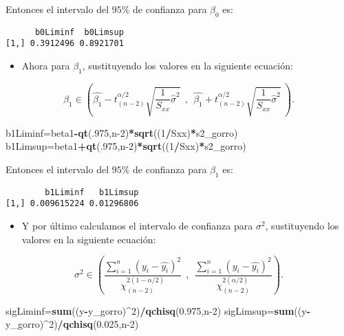 \documentclass[
  a4paper,
  oneside,
  openany]{book}
\newenvironment{Shaded}{\begin{snugshade}}{\end{snugshade}}
\newcommand{\DecValTok}[1]{\textcolor[rgb]{0.00,0.00,0.81}{#1}}
\newcommand{\FloatTok}[1]{\textcolor[rgb]{0.00,0.00,0.81}{#1}}
\newcommand{\KeywordTok}[1]{\textcolor[rgb]{0.13,0.29,0.53}{\textbf{#1}}}
\newcommand{\NormalTok}[1]{#1}
\newcommand{\OperatorTok}[1]{\textcolor[rgb]{0.81,0.36,0.00}{\textbf{#1}}}
\providecommand{\tightlist}{%
  \setlength{\itemsep}{0pt}\setlength{\parskip}{0pt}}
\begin{document}
Entonces el intervalo del \(95\%\) de confianza para \(\beta_{0}\) es:

\begin{verbatim}
      b0Liminf  b0Limsup
[1,] 0.3912496 0.8921701
\end{verbatim}

\begin{itemize}
\tightlist
\item
  Ahora para \(\beta_1\), sustituyendo los valores en la siguiente ecuación:
\end{itemize}

\[\beta_{1} \in \left( \hat{\beta_{1}}-t^{\alpha/2}_{(n-2)} \sqrt{\frac{1}{S_{xx}}\hat{\sigma}^2} \ \ , \ \ \hat{\beta_{1}}+t^{\alpha/2}_{(n-2)} \sqrt{\frac{1}{S_{xx}}\hat{\sigma}^2} \ \right).\]

\begin{Shaded}
\begin{Highlighting}[]
\NormalTok{b1Liminf=beta1}\OperatorTok{{-}}\KeywordTok{qt}\NormalTok{(.}\DecValTok{975}\NormalTok{,n}\DecValTok{{-}2}\NormalTok{)}\OperatorTok{*}\KeywordTok{sqrt}\NormalTok{((}\DecValTok{1}\OperatorTok{/}\NormalTok{Sxx)}\OperatorTok{*}\NormalTok{s2\_gorro) }
\NormalTok{b1Limsup=beta1}\OperatorTok{+}\KeywordTok{qt}\NormalTok{(.}\DecValTok{975}\NormalTok{,n}\DecValTok{{-}2}\NormalTok{)}\OperatorTok{*}\KeywordTok{sqrt}\NormalTok{((}\DecValTok{1}\OperatorTok{/}\NormalTok{Sxx)}\OperatorTok{*}\NormalTok{s2\_gorro) }
\end{Highlighting}
\end{Shaded}

Entonces el intervalo del \(95\%\) de confianza para \(\beta_{1}\) es:

\begin{verbatim}
        b1Liminf   b1Limsup
[1,] 0.009615224 0.01296806
\end{verbatim}

\begin{itemize}
\tightlist
\item
  Y por último calculamos el intervalo de confianza para \(\sigma^2\), sustituyendo los valores en la siguiente ecuación:
\end{itemize}

\[\sigma^2 \in \left( \frac{\sum_{i=1}^{n}(y_i-\hat{y_{i}})^2}{\chi^{2(1-\alpha/2)}_{(n-2)}} \ \ , \ \ \frac{\sum_{i=1}^{n}(y_i-\hat{y_{i}})^2} {\chi^{2(\alpha/2)}_{(n-2)}} \right).\]

\begin{Shaded}
\begin{Highlighting}[]
\NormalTok{sigLiminf=}\KeywordTok{sum}\NormalTok{((y}\OperatorTok{{-}}\NormalTok{y\_gorro)}\OperatorTok{\^{}}\DecValTok{2}\NormalTok{)}\OperatorTok{/}\KeywordTok{qchisq}\NormalTok{(}\FloatTok{0.975}\NormalTok{,n}\DecValTok{{-}2}\NormalTok{) }
\NormalTok{sigLimsup=}\KeywordTok{sum}\NormalTok{((y}\OperatorTok{{-}}\NormalTok{y\_gorro)}\OperatorTok{\^{}}\DecValTok{2}\NormalTok{)}\OperatorTok{/}\KeywordTok{qchisq}\NormalTok{(}\FloatTok{0.025}\NormalTok{,n}\DecValTok{{-}2}\NormalTok{) }
\end{Highlighting}
\end{Shaded}
\end{document}
